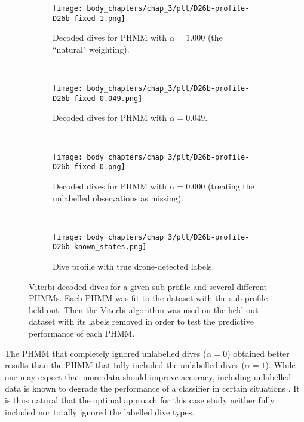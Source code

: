 \begin{figure}
    \centering
    \begin{subfigure}[t]{0.475\textwidth}
        \centering
        \texttt{[image: body\_chapters/chap\_3/plt/D26b-profile-D26b-fixed-1.png]}
        \caption{Decoded dives for PHMM with $\alpha = 1.000$ (the ``natural" weighting).}
    \end{subfigure}%
    ~ 
    \begin{subfigure}[t]{0.475\textwidth}
        \centering
        \texttt{[image: body\_chapters/chap\_3/plt/D26b-profile-D26b-fixed-0.049.png]}
        \caption{Decoded dives for PHMM with $\alpha = 0.049$.}
    \end{subfigure}
    \\
    \begin{subfigure}[t]{0.475\textwidth}
        \centering
        \texttt{[image: body\_chapters/chap\_3/plt/D26b-profile-D26b-fixed-0.png]}
        \caption{Decoded dives for PHMM with $\alpha = 0.000$ (treating the unlabelled observations as missing).}
    \end{subfigure}
    ~
    \begin{subfigure}[t]{0.475\textwidth}
        \centering
        \texttt{[image: body\_chapters/chap\_3/plt/D26b-profile-D26b-known\_states.png]}
        \caption{Dive profile with true drone-detected labels.}
    \end{subfigure}
    \caption[Viterbi-decoded dives for a given sub-profile and several different PHMMs from the first case study.]{Viterbi-decoded dives for a given sub-profile and several different PHMMs. Each PHMM was fit to the dataset with the sub-profile held out. Then the Viterbi algorithm was used on the held-out dataset with its labels removed in order to test the predictive performance of each PHMM.}
    \label{fig:viterbi_dives_D26b}
\end{figure}

The PHMM that completely ignored unlabelled dives ($\alpha = 0$) obtained better results than the PHMM that fully included the unlabelled dives ($\alpha = 1$). While one may expect that more data should improve accuracy, including unlabelled data is known to degrade the performance of a classifier in certain situations \citep{Singh:2008}. It is thus natural that the optimal approach for this case study neither fully included nor totally ignored the labelled dive types. %

